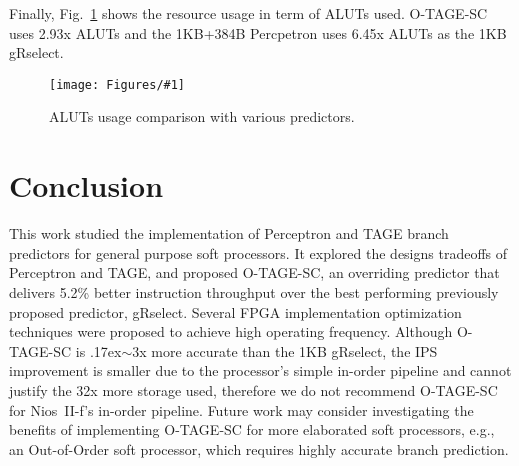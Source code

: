\documentclass[conference]{IEEEtran}
\newcommand{\mytilde}{{\raise.17ex\hbox{$\scriptstyle\sim$}}}
\newcommand{\kfig}[4]{ %
        \begin{figure}[!t]
        \centering
        \texttt{[image: Figures/\#1]}
        \vspace{-1mm}
        \caption{#3}
        \vspace{-6mm}
        \label{#2}
        \end{figure}
}
\begin{document}
Finally, Fig.~\ref{fig:adarea} shows the resource usage in term of ALUTs used. \mbox{O-TAGE-SC} uses 2.93x ALUTs and the 1KB+384B Percpetron uses 6.45x ALUTs as the 1KB gRselect.
\kfig{adarea.pdf}{fig:adarea}{ALUTs usage comparison with various predictors.}{angle = 0, trim = 0.9in 2.7in 0.7in 2.7in, clip, width=0.4\textwidth}

\section{Conclusion}
This work studied the implementation of Perceptron and TAGE branch predictors for general purpose soft processors. It explored the designs tradeoffs of Perceptron and TAGE, and proposed \mbox{O-TAGE-SC}, an overriding predictor that delivers 5.2\% better instruction throughput over the best performing previously proposed predictor, gRselect. Several FPGA implementation optimization techniques were proposed to achieve high operating frequency. Although \mbox{O-TAGE-SC} is \mytilde 3x more accurate than the 1KB gRselect, the IPS improvement is smaller due to the processor's simple in-order pipeline and cannot justify the 32x more storage used, therefore we do not recommend \mbox{O-TAGE-SC} for Nios~II-f's in-order pipeline. Future work may consider investigating the benefits of implementing \mbox{O-TAGE-SC} for more elaborated soft processors, e.g., an Out-of-Order soft processor, which requires highly accurate branch prediction. 









\end{document}
